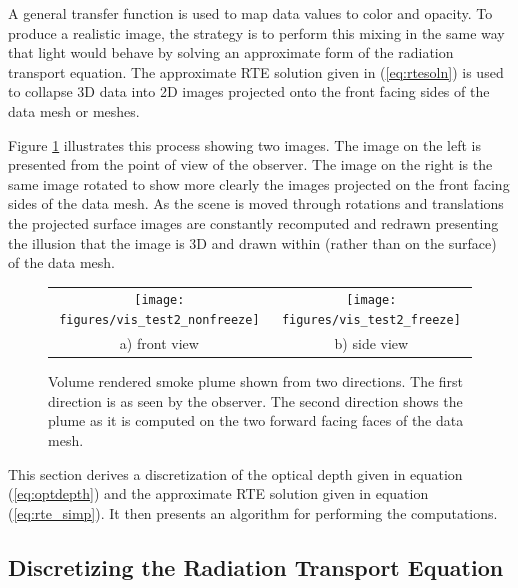 A general transfer function is used to map data values to color and opacity. To produce a realistic image, the strategy is to perform this mixing in the same way that light would behave by solving an approximate form of the radiation transport equation.  The approximate RTE solution given in (\ref{eq:rtesoln})  is used to collapse 3D data into 2D images projected onto the front facing sides of the data mesh or meshes.

Figure \ref{fig:volplume_example} illustrates this process showing two images.  The image on the left is presented from the point of view of the observer.  The image on the right is the same image rotated to show more clearly the images projected on the front facing sides of the data mesh.  As the scene is moved through rotations and translations the projected surface images are constantly recomputed and redrawn presenting the illusion that the image is 3D and drawn within (rather than on the surface) of the data mesh.

\begin{figure}[\figoptions]
\begin{center}
\begin{tabular}{cc}
\texttt{[image: figures/vis\_test2\_nonfreeze]}&
\texttt{[image: figures/vis\_test2\_freeze]}\\
a) front view&b) side view\\
\end{tabular}
\end{center}
\caption[Volume rendered smoke plume shown from two directions.]{Volume rendered smoke plume shown from two directions.
The first direction is as seen by the observer.  The second direction shows the plume as it is computed on the two forward facing faces of the data mesh.
}
\label{fig:volplume_example}
\end{figure}

This section derives a discretization of the optical depth given in equation (\ref{eq:optdepth}) and the approximate RTE solution given in equation (\ref{eq:rte_simp}).  It then presents an algorithm for performing the computations.


\subsection{Discretizing the Radiation Transport Equation}
\newcommand{\htau}[1]{\tau_{#1}^{N-1}}
\newcommand{\halpha}[1]{\alpha_{#1}^{N-1}}
\newcommand{\sigai}[1]{\sigma_{a,#1}}
\newcommand{\Lei}[1]{C_{e,#1}}
\newcommand{\Lhatj}[1]{C_{#1}^N}
\newcommand{\Lhatjj}[1]{\hat{C}_{#1}^N}
\newcommand{\Chatjj}[1]{\hat{C}_{#1}^N}
\newcommand{\Leii}[1]{\hat{C}_{e,#1}}

